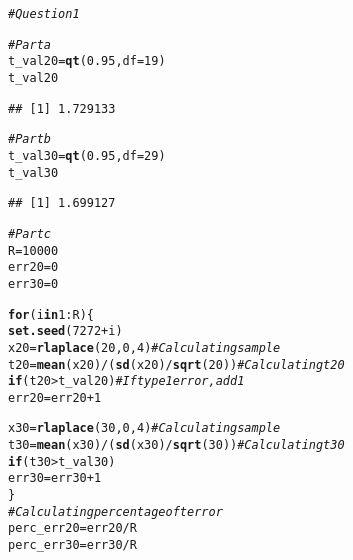 \documentclass{article}\usepackage[]{graphicx}\usepackage[]{xcolor}
\makeatletter
\newcommand{\hlnum}[1]{\textcolor[rgb]{0.686,0.059,0.569}{#1}}%
\newcommand{\hlcom}[1]{\textcolor[rgb]{0.678,0.584,0.686}{\textit{#1}}}%
\newcommand{\hlopt}[1]{\textcolor[rgb]{0,0,0}{#1}}%
\newcommand{\hldef}[1]{\textcolor[rgb]{0.345,0.345,0.345}{#1}}%
\newcommand{\hlkwa}[1]{\textcolor[rgb]{0.161,0.373,0.58}{\textbf{#1}}}%
\newcommand{\hlkwb}[1]{\textcolor[rgb]{0.69,0.353,0.396}{#1}}%
\newcommand{\hlkwc}[1]{\textcolor[rgb]{0.333,0.667,0.333}{#1}}%
\newcommand{\hlkwd}[1]{\textcolor[rgb]{0.737,0.353,0.396}{\textbf{#1}}}%
\newenvironment{kframe}{%
 \def\at@end@of@kframe{}%
 \ifinner\ifhmode%
  \def\at@end@of@kframe{\end{minipage}}%
  \begin{minipage}{\columnwidth}%
 \fi\fi%
 \def\FrameCommand##1{\hskip\@totalleftmargin \hskip-\fboxsep
 \colorbox{shadecolor}{##1}\hskip-\fboxsep
     \hskip-\linewidth \hskip-\@totalleftmargin \hskip\columnwidth}%
 \MakeFramed {\advance\hsize-\width
   \@totalleftmargin\z@ \linewidth\hsize
   \@setminipage}}%
 {\par\unskip\endMakeFramed%
 \at@end@of@kframe}
\newenvironment{knitrout}{}{} %
\makeatother
\begin{document}
\begin{enumerate}
\begin{enumerate}
\begin{knitrout}
\begin{kframe}
{\ttfamily\noindent\itshape\color{messagecolor}{\#\# Loading required package: splines}}\begin{alltt}
\hlcom{#Question 1}

\hlcom{#Part a}
\hldef{t_val20} \hlkwb{=} \hlkwd{qt}\hldef{(}\hlnum{0.95}\hldef{,} \hlkwc{df}\hldef{=}\hlnum{19}\hldef{)}
\hldef{t_val20}
\end{alltt}
\begin{verbatim}
## [1] 1.729133
\end{verbatim}
\begin{alltt}
\hlcom{#Part b}
\hldef{t_val30} \hlkwb{=} \hlkwd{qt}\hldef{(}\hlnum{0.95}\hldef{,} \hlkwc{df}\hldef{=}\hlnum{29}\hldef{)}
\hldef{t_val30}
\end{alltt}
\begin{verbatim}
## [1] 1.699127
\end{verbatim}
\begin{alltt}
\hlcom{#Part c}
\hldef{R}\hlkwb{=}\hlnum{10000}
\hldef{err20} \hlkwb{=} \hlnum{0}
\hldef{err30} \hlkwb{=} \hlnum{0}

\hlkwa{for}\hldef{(i} \hlkwa{in} \hlnum{1}\hlopt{:}\hldef{R)\{}
\hlkwd{set.seed}\hldef{(}\hlnum{7272}\hlopt{+}\hldef{i)}
\hldef{x20} \hlkwb{=} \hlkwd{rlaplace}\hldef{(}\hlnum{20}\hldef{,}\hlnum{0}\hldef{,}\hlnum{4}\hldef{)} \hlcom{#Calculating sample}
\hldef{t20} \hlkwb{=} \hlkwd{mean}\hldef{(x20)} \hlopt{/} \hldef{(}\hlkwd{sd}\hldef{(x20)}\hlopt{/}\hlkwd{sqrt}\hldef{(}\hlnum{20}\hldef{))} \hlcom{#Calculating t20}
\hlkwa{if} \hldef{(t20}\hlopt{>}\hldef{t_val20)} \hlcom{#If type1 error, add 1}
  \hldef{err20}\hlkwb{=}\hldef{err20}\hlopt{+}\hlnum{1}

\hldef{x30} \hlkwb{=} \hlkwd{rlaplace}\hldef{(}\hlnum{30}\hldef{,}\hlnum{0}\hldef{,}\hlnum{4}\hldef{)} \hlcom{#Calculating sample}
\hldef{t30} \hlkwb{=} \hlkwd{mean}\hldef{(x30)} \hlopt{/} \hldef{(}\hlkwd{sd}\hldef{(x30)}\hlopt{/}\hlkwd{sqrt}\hldef{(}\hlnum{30}\hldef{))} \hlcom{#Calculating t30}
\hlkwa{if} \hldef{(t30}\hlopt{>}\hldef{t_val30)}
  \hldef{err30}\hlkwb{=}\hldef{err30}\hlopt{+}\hlnum{1}
\hldef{\}}
\hlcom{#Calculating percentage of t error}
\hldef{perc_err20} \hlkwb{=} \hldef{err20}\hlopt{/}\hldef{R}
\hldef{perc_err30}\hlkwb{=} \hldef{err30}\hlopt{/}\hldef{R}


\end{alltt}
\end{kframe}
\end{knitrout}
\end{enumerate}
\end{enumerate}
\end{document}
